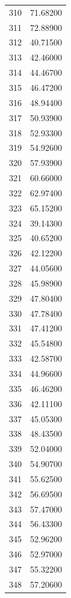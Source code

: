 \documentclass[
  letterpaper,
  DIV=11,
  numbers=noendperiod]{scrreprt}
\begin{document}
\begin{tcolorbox}
\begin{tabular}{lr}
310  &         71.68200 \\
311  &         72.88900 \\
312  &         40.71500 \\
313  &         42.46000 \\
314  &         44.46700 \\
315  &         46.47200 \\
316  &         48.94400 \\
317  &         50.93900 \\
318  &         52.93300 \\
319  &         54.92600 \\
320  &         57.93900 \\
321  &         60.66000 \\
322  &         62.97400 \\
323  &         65.15200 \\
324  &         39.14300 \\
325  &         40.65200 \\
326  &         42.12200 \\
327  &         44.05600 \\
328  &         45.98900 \\
329  &         47.80400 \\
330  &         47.78400 \\
331  &         47.41200 \\
332  &         45.54800 \\
333  &         42.58700 \\
334  &         44.96600 \\
335  &         46.46200 \\
336  &         42.11100 \\
337  &         45.05300 \\
338  &         48.43500 \\
339  &         52.04000 \\
340  &         54.90700 \\
341  &         55.62500 \\
342  &         56.69500 \\
343  &         57.47000 \\
344  &         56.43300 \\
345  &         52.96200 \\
346  &         52.97000 \\
347  &         55.32200 \\
348  &         57.20600 \\

\end{tabular}
\end{tcolorbox}
\end{document}
